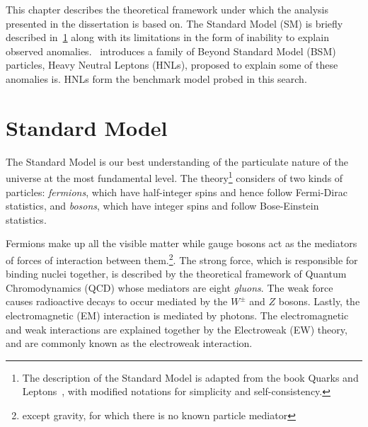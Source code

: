 This chapter describes the theoretical framework under which the analysis presented in the dissertation is based on. The Standard Model (SM) is briefly described in~\cref{sec:sm} along with its limitations in the form of inability to explain observed anomalies.~ introduces a family of Beyond Standard Model (BSM) particles, Heavy Neutral Leptons (HNLs), proposed to explain some of these anomalies is. HNLs form the benchmark model probed in this search.

\section{Standard Model}\label{sec:sm}
The Standard Model is our best understanding of the particulate nature of the universe at the most fundamental level. The theory\footnote{The description of the Standard Model is adapted from the book Quarks and Leptons~\cite{Halzen:1984mc}, with modified notations for simplicity and self-consistency.} considers of two kinds of particles: \textit{fermions}, which have half-integer spins and hence follow Fermi-Dirac statistics, and \textit{bosons}, which have integer spins and follow Bose-Einstein statistics. 

Fermions make up all the visible matter while gauge bosons act as the mediators of forces of interaction between them.\footnote{except gravity, for which there is no known particle mediator}. The strong force, which is responsible for binding nuclei together, is described by the theoretical framework of Quantum Chromodynamics (QCD) whose mediators are eight \textit{gluons}. The weak force causes radioactive decays to occur mediated by the $W^\pm$ and $Z$ bosons. Lastly, the electromagnetic (EM) interaction is mediated by photons. The electromagnetic and weak interactions are explained together by the Electroweak (EW) theory, and are commonly known as the electroweak interaction.

